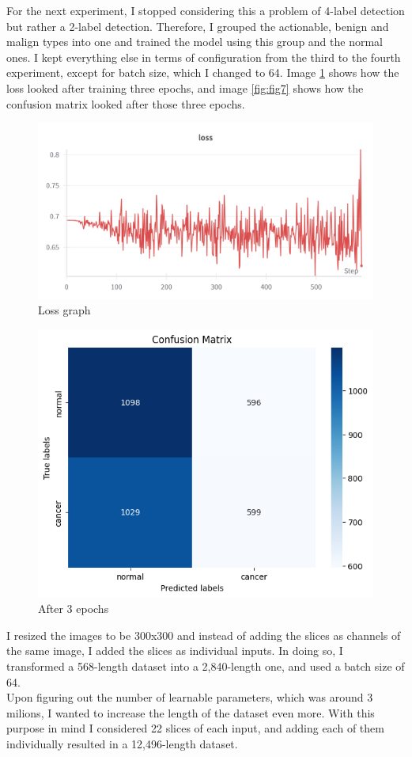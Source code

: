 For the next experiment, I stopped considering this a problem of 4-label detection but rather a 2-label detection. Therefore, I grouped the actionable, benign and malign types into one and trained the model using this group and the normal ones. I kept everything else in terms of configuration from the third to the fourth experiment, except for batch size, which I changed to 64. Image \ref{fig:fig16} shows how the loss looked after training three epochs, and image \ref{fig:fig7} shows how the confusion matrix looked after those three epochs.\\
\begin{figure}[ht!]
    \centering
    \includegraphics[width=1\linewidth]{figures/Figure17.png}
    \caption{Loss graph}
    \label{fig:fig16}
\end{figure}
\begin{figure}[ht!]
    \centering
    \includegraphics[width=0.5\linewidth]{figures/Figure18.png}
    \caption{After 3 epochs}
    \label{fig:fig17}
\end{figure}
I resized the images to be 300x300 and instead of adding the slices as channels of the same image, I added the slices as individual inputs. In doing so, I transformed a 568-length dataset into a 2,840-length one, and used a batch size of 64.\\
Upon figuring out the number of learnable parameters, which was around 3 milions, I wanted to increase the length of the dataset even more. With this purpose in mind I considered 22 slices of each input, and adding each of them individually resulted in a 12,496-length dataset.\\
